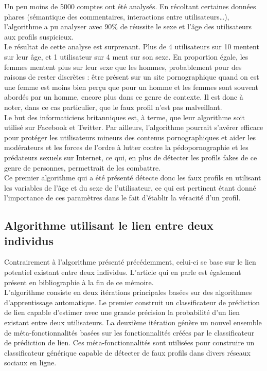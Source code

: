 \documentclass[12pt]{report}
\begin{document}
Un peu moins de 5000 comptes ont été analysés. En récoltant certaines données phares (sémantique des commentaires, interactions entre utilisateurs…), l’algorithme a pu analyser avec 90\% de réussite le sexe et l’âge des utilisateurs aux profils suspicieux.\\

Le résultat de cette analyse est surprenant. Plus de 4 utilisateurs sur 10 mentent sur leur âge, et 1 utilisateur sur 4 ment sur son sexe. En proportion égale, les femmes mentent plus sur leur sexe que les hommes, probablement pour des raisons de rester discrètes : être présent sur un site pornographique quand on est une femme est moins bien perçu que pour un homme et les femmes sont souvent abordés par un homme, encore plus dans ce genre de contexte. Il est donc à noter, dans ce cas particulier, que le faux profil n'est pas malveillant.\\

Le but des informaticiens britanniques est, à terme, que leur algorithme soit utilisé sur Facebook et Twitter. Par ailleurs, l’algorithme pourrait s’avérer efficace pour protéger les utilisateurs mineurs des contenus pornographiques et aider les modérateurs et les forces de l’ordre à lutter contre la pédopornographie et les prédateurs sexuels sur Internet, ce qui, en plus de détecter les profils fakes de ce genre de personnes, permettrait de les combattre.\\

Ce premier algorithme qui a été présenté détecte donc les faux profils en utilisant les variables de l'âge et du sexe de l'utilisateur, ce qui est pertinent étant donné l'importance de ces paramètres dans le fait d'établir la véracité d'un profil. 

\subsection{Algorithme utilisant le lien entre deux individus}
Contrairement à l'algorithme présenté précédemment, celui-ci se base sur le lien potentiel existant entre deux individus. L'article qui en parle est également présent en bibliographie à la fin de ce mémoire.\\

L'algorithme consiste en deux itérations principales basées sur des algorithmes d'apprentissage automatique. Le premier construit un classificateur de prédiction de lien capable d’estimer avec une grande précision la probabilité d’un lien existant entre deux utilisateurs. La deuxième itération génère un nouvel ensemble de méta-fonctionnalités basées sur les fonctionnalités créées par le classificateur de prédiction de lien. Ces méta-fonctionnalités sont utilisées pour construire un classificateur générique capable de détecter de faux profils dans divers réseaux sociaux en ligne.\\
\end{document}

